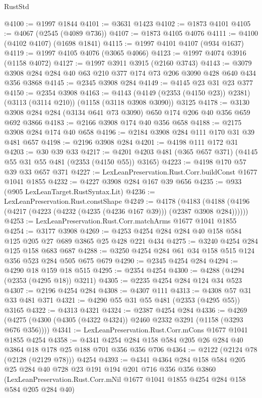 \begin{lexlean}{RustStd}
\begin{coremodule}
@4100 := @1997 @1844
@4101 := @3631 @1423
@4102 := @1873 @4101
@4105 := @4067 (@2545 (@4089 @736))
@4107 := @1873 @4105 @4076
@4111 := @4100 (@4102 @4107) (@1698 @1841)
@4115 := @1997 @4101 @4107 (@934 @1637)
@4119 := @1997 @4105 @4076 (@3065 @4066)
@4123 := @1997 @4074 @3916 (@1158 @4072)
@4127 := @1997 @3911 @3915 (@2160 @3743)
@4143 := @3079 @3908 @284 @284 @40 @63 @210 @377 @174 @73 @206 @3090 @428 @640 @434 @356 @3868
@4145 := @2345 @3908 @284
@4149 := @4145 @23 @31 @23 @377
@4150 := @2354 @3908
@4163 := @4143
    (@4149 (@2353 (@4150 @23)) @2381)
    (@3113 (@3114 @210))
    (@1158 (@3118 @3908 @3090))
    @3125
@4178 := @3130 @3908 @284 @284 (@3134 @641 @73 @3090) @650 @174 @206 @40 @356 @659 @692 @3866
@4183 := @2166 @3908 @174 @40 @356 @658
@4188 := @2175 @3908 @284 @174 @40 @658
@4196 := @2184 @3908 @284 @111 @170 @31 @39 @481 @657
@4198 := @2196 @3908 @284
@4201 := @4198 @111 @172 @31
@4203 := @30 @39 @33
@4217 := @4201 @4203 @481 (@365 @657 @371) (@4145 @55 @31 @55 @481 (@2353 (@4150 @55)) @3165)
@4223 := @4198 @170 @57 @39 @33 @657 @371
@4227 := LexLeanPreservation.Rust.Corr.buildConst @1677 @1041 @1855
@4232 := @4227 @3908 @284 @167 @39 @656
@4235 := @933 (@905 LexLeanTarget.RustSyntax.Lit)
@4236 := LexLeanPreservation.Rust.constShape
@4249 := @4178
    (@4183 (@4188 (@4196 (@4217 (@4223 (@4232 (@4235 (@4236 @167 @39))) (@2387 @3908 @284))))))
@4253 := LexLeanPreservation.Rust.Corr.matchArms @1677 @1041 @1855
@4254 := @3177 @3908
@4269 := @4253 @4254 @284 @284 @40 @158 @584 @125 @205 @27 @689 @3865 @25 @428 @221 @434
@4275 := @3240 @4254 @284 @125 @158 @683 @687
@4288 := @3250 @4254 @284 @61 @34 @158 @515 @124 @356 @523 @284 @505 @675 @679
@4290 := @2345 @4254 @284
@4294 := @4290 @18 @159 @18 @515
@4295 := @2354 @4254
@4300 := @4288 (@4294 (@2353 (@4295 @18)) @3211)
@4305 := @2235 @4254 @284 @124 @34 @523
@4307 := @2196 @4254 @284
@4308 := @4307 @111
@4313 := @4308 @57 @31 @33 @481 @371
@4321 := @4290 @55 @31 @55 @481 (@2353 (@4295 @55)) @3165
@4322 := @4313 @4321
@4324 := @2387 @4254 @284
@4336 := @4269 (@4275 (@4300 (@4305 (@4322 @4324)) @2460 @2332 @3291 (@1158 (@3293 @676 @356))))
@4341 := LexLeanPreservation.Rust.Corr.mCons @1677 @1041 @1855 @4254
@4358 := @4341 @4254 @284 @158 @584 @205 @26 @284 @40 @3864 @18 @178 @25 @188 @701 @356 @356 @706
@4364 := @2122 (@2124 @78 (@2128 (@2129 @78))) @4254
@4393 := @4341
    @4364
    @284
    @158
    @584
    @205
    @25
    @284
    @40
    @728
    @23
    @191
    @194
    @201
    @716
    @356
    @356
    @3860
    (LexLeanPreservation.Rust.Corr.mNil @1677 @1041 @1855 @4254 @284 @158 @584 @205 @284 @40)

\end{coremodule}
\end{lexlean}
